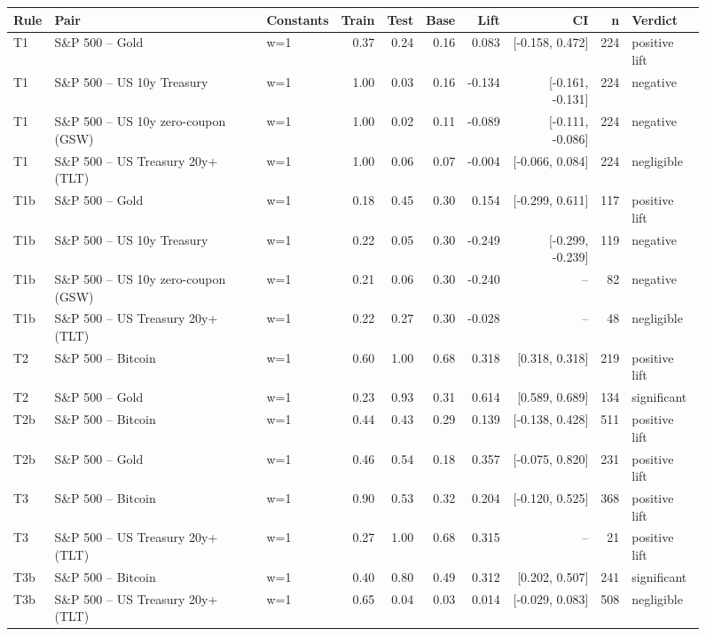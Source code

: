 \begin{figure}
\centering
\begin{tabular}{lllrrrrrrl}
\toprule
Rule & Pair & Constants & Train & Test & Base & Lift & CI & n & Verdict \\
\midrule
T1 & S\&P 500 -- Gold & w=1 & 0.37 & 0.24 & 0.16 & 0.083 & [-0.158, 0.472] & 224 & positive lift \\
T1 & S\&P 500 -- US 10y Treasury & w=1 & 1.00 & 0.03 & 0.16 & -0.134 & [-0.161, -0.131] & 224 & negative \\
T1 & S\&P 500 -- US 10y zero-coupon (GSW) & w=1 & 1.00 & 0.02 & 0.11 & -0.089 & [-0.111, -0.086] & 224 & negative \\
T1 & S\&P 500 -- US Treasury 20y+ (TLT) & w=1 & 1.00 & 0.06 & 0.07 & -0.004 & [-0.066, 0.084] & 224 & negligible \\
T1b & S\&P 500 -- Gold & w=1 & 0.18 & 0.45 & 0.30 & 0.154 & [-0.299, 0.611] & 117 & positive lift \\
T1b & S\&P 500 -- US 10y Treasury & w=1 & 0.22 & 0.05 & 0.30 & -0.249 & [-0.299, -0.239] & 119 & negative \\
T1b & S\&P 500 -- US 10y zero-coupon (GSW) & w=1 & 0.21 & 0.06 & 0.30 & -0.240 & -- & 82 & negative \\
T1b & S\&P 500 -- US Treasury 20y+ (TLT) & w=1 & 0.22 & 0.27 & 0.30 & -0.028 & -- & 48 & negligible \\
T2 & S\&P 500 -- Bitcoin & w=1 & 0.60 & 1.00 & 0.68 & 0.318 & [0.318, 0.318] & 219 & positive lift \\
T2 & S\&P 500 -- Gold & w=1 & 0.23 & 0.93 & 0.31 & 0.614 & [0.589, 0.689] & 134 & significant \\
T2b & S\&P 500 -- Bitcoin & w=1 & 0.44 & 0.43 & 0.29 & 0.139 & [-0.138, 0.428] & 511 & positive lift \\
T2b & S\&P 500 -- Gold & w=1 & 0.46 & 0.54 & 0.18 & 0.357 & [-0.075, 0.820] & 231 & positive lift \\
T3 & S\&P 500 -- Bitcoin & w=1 & 0.90 & 0.53 & 0.32 & 0.204 & [-0.120, 0.525] & 368 & positive lift \\
T3 & S\&P 500 -- US Treasury 20y+ (TLT) & w=1 & 0.27 & 1.00 & 0.68 & 0.315 & -- & 21 & positive lift \\
T3b & S\&P 500 -- Bitcoin & w=1 & 0.40 & 0.80 & 0.49 & 0.312 & [0.202, 0.507] & 241 & significant \\
T3b & S\&P 500 -- US Treasury 20y+ (TLT) & w=1 & 0.65 & 0.04 & 0.03 & 0.014 & [-0.029, 0.083] & 508 & negligible \\

\end{tabular}
\end{figure}

